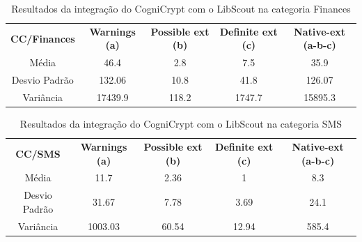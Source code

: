 \begin{table}[!htbp]
  \centering
  \small
  \begin{tabular}{|c|c|c|c|c|}
  
\textbf{CC/Finances}   & \textbf{Warnings (a)}   &  \textbf{Possible ext (b)}     &  \textbf{Definite ext (c)} &  \textbf{Native-ext (a-b-c)} \\ 
Média                      & \num{46.4}          &  \num{2.8}                                                  & \num{7.5}                                         & \num{35.9}                                                    \\
Desvio Padrão              & \num{132.06}           &  \num{10.8}                                                 & \num{41.8}                                        & \num{126.07}          \\                                          
Variância                  & \num{17439.9}       &  \num{118.2}                                                & \num{1747.7}                                      & \num{15895.3}    \\                                                
\end{tabular}
    
  \caption{Resultados da integração do CogniCrypt com o LibScout na categoria Finances}
\label{table: AplicativosComWarningCCF}
\end{table}


\begin{table}[!htbp]
  \centering
  \small
  \begin{tabular}{|c|c|c|c|c|}
  
\textbf{CC/SMS}   & \textbf{Warnings (a)}   &  \textbf{Possible ext (b)}     &  \textbf{Definite ext (c)} &  \textbf{Native-ext (a-b-c)} \\ 
Média                      & \num{11.7}              &  \num{2.36}                                         & \num{1}                                        & \num{8.3}                                                    \\
Desvio Padrão              & \num{31.67}              &  \num{7.78}                                         & \num{3.69}                                        & \num{24.1}   \\                                                 
Variância                  & \num{1003.03}            &  \num{60.54}                                         & \num{12.94}                                       & \num{585.4}             \\                                       
\end{tabular}
    
  \caption{Resultados da integração do CogniCrypt com o LibScout na categoria SMS}
\label{table: AplicativosComWarningCCSMS}
\end{table}


